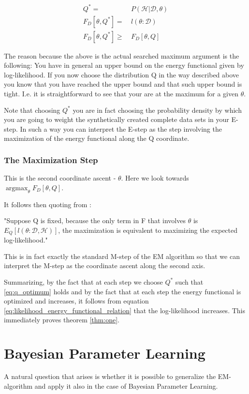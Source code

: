 \documentclass[11pt]{article}
\begin{document}
\begin{article}
\begin{align} \label{eq:q_optimum}
Q^* =& \ P (\mathscr{H}|\mathscr{D}, \theta) \\
F_D[\theta, Q^*] =& \ l (\theta: \mathscr{D}) \\
F_D[\theta, Q^*] \geq& \ F_D[\theta, Q]
\end{align}

The reason because the above is the actual searched maximum
argument is the following: You have in general an upper bound on
the energy functional given by log-likelihood. If you now choose
the distribution Q in the way described above you know that you
have reached the upper bound and that such upper bound is
tight. I.e. it is straightforward to see that your are at the
maximum for a given \(\theta\).

Note that choosing \(Q^*\) you are in fact choosing the probability
density by which you are going to weight the synthetically created
complete data sets in your E-step. In such a way you can interpret
the E-step as the step involving the maximization of the energy
functional along the Q coordinate.

\subsubsection{The Maximization Step}
\label{sec:org9c2e582}

This is the second coordinate ascent - \(\theta\). Here we look
towards \(\operatorname*{argmax}_{\theta} F_D[\theta, Q]\).

It follows then quoting from
\cite{koller2009probabilistic}:

"Suppose Q is fixed, because the only term in F that involves \(\theta\) is
\(E_Q[l (\theta: \mathscr{D}, \mathscr{H})]\), the maximization is
equivalent to maximizing the expected log-likelihood."

This is in fact exactly the standard M-step of the EM algorithm so
that we can interpret the M-step as the coordinate ascent along
the second axis. 

Summarizing, by the fact that at each step we choose \(Q^*\) such
that \ref{eq:q_optimum} holds and by the fact that at each step the
energy functional is optimized and increases, it follows from
equation \ref{eq:likelihood_energy_functional_relation} that the
log-likelihood increases. This immediately proves theorem
\ref{thm:one}.

\newpage

\section{Bayesian Parameter Learning}
\label{bayes-parameter-learning}
A natural question that arises is whether it is possible to
generalize the EM-algorithm and apply it also in the case of
Bayesian Parameter Learning.


\end{article}
\end{document}

